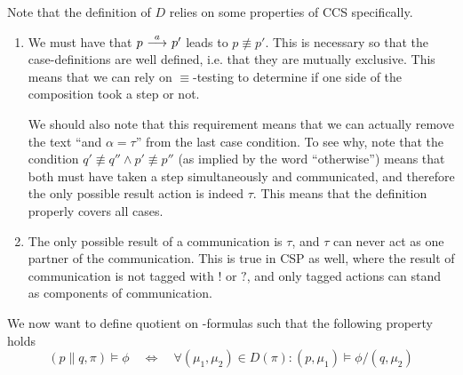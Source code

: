 Note that the definition of $D$ relies on some properties of CCS specifically.
\begin{enumerate}
    \item We must have that $p \ {\stackrel{{a}}{\longrightarrow}}\  p'$ leads to $p\not\equiv p'$. This is
          necessary so that the case-definitions are well defined, i.e. that
          they are mutually exclusive. This means that we can rely on
          $\equiv$-testing to determine if one side of the composition took
          a step or not.

          We should also note that this requirement means that we can actually
          remove the text ``and $\alpha=\tau$'' from the last case condition. To
          see why, note that the condition $q'\not\equiv q'' \land p'\not\equiv p''$
          (as implied by the word ``otherwise'') means that both must have taken
          a step simultaneously and communicated,  and therefore the only possible
          result action is indeed $\tau$. This means that the definition properly
          covers all cases.
    \item The only possible result of a communication is $\tau$, and $\tau$
          can never act as one partner of the communication. This is true in CSP
          as well, where the result of communication is not tagged with $!$ or
          $?$, and only tagged actions can stand as components of communication.
\end{enumerate}

We now want to define quotient on \HMLpast-formulas such that the following
property holds
\[
    (p\parallel q, \pi) \vDash \phi  \quad\Leftrightarrow\quad
    \forall (\mu_1,\mu_2)\in D(\pi) : (p, \mu_1) \vDash \phi/(q, \mu_2)
\]


